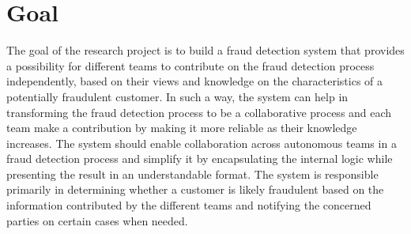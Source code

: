 \section{Goal}

  The goal of the research project is to build a fraud detection system that provides a possibility for different teams to contribute on the fraud detection process independently, based on their views and knowledge on the characteristics of a potentially fraudulent customer. In such a way, the system can help in transforming the fraud detection process to be a collaborative process and each team make a contribution by making it more reliable as their knowledge increases. The system should enable collaboration across autonomous teams in a fraud detection process and simplify it by encapsulating the internal logic while presenting the result in an understandable format. The system is responsible primarily in determining whether a customer is likely fraudulent based on the information contributed by the different teams and notifying the concerned parties on certain cases when needed.